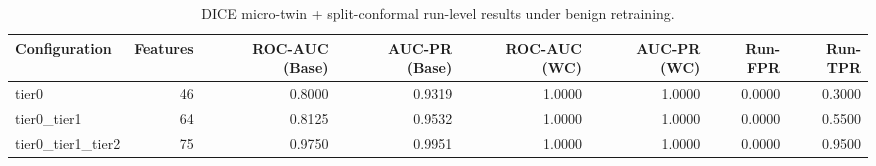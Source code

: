 \begin{table}[t]
\centering
\caption{DICE micro-twin + split-conformal run-level results under benign retraining.}
\label{tab:dice_full_overall}
\footnotesize
\begin{tabular}{lrrrrrrr}
\toprule
Configuration & Features & ROC-AUC (Base) & AUC-PR (Base) & ROC-AUC (WC) & AUC-PR (WC) & Run-FPR & Run-TPR \\
\midrule
tier0 & 46 & 0.8000 & 0.9319 & 1.0000 & 1.0000 & 0.0000 & 0.3000 \\
tier0_tier1 & 64 & 0.8125 & 0.9532 & 1.0000 & 1.0000 & 0.0000 & 0.5500 \\
tier0_tier1_tier2 & 75 & 0.9750 & 0.9951 & 1.0000 & 1.0000 & 0.0000 & 0.9500 \\
\bottomrule
\end{tabular}

\end{table}
